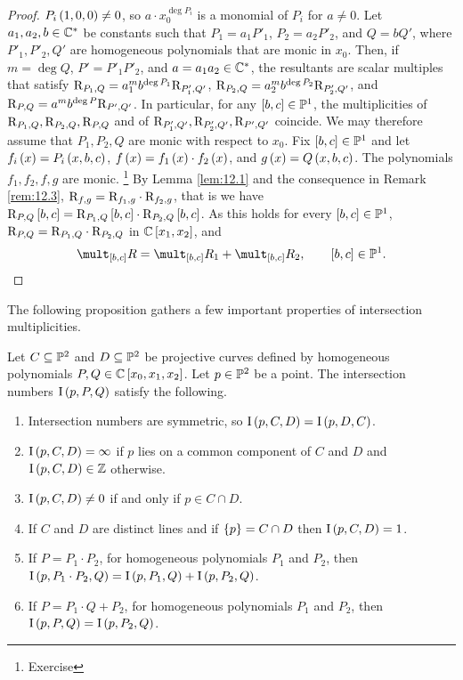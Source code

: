 \begin{proof}
$ P_i\br{1, 0, 0} \ne 0 $, so $ a \cdot x_0^{\deg P_i} $ is a monomial of $ P_i $ for $ a \ne 0 $. Let $ a_1, a_2, b \in \mathbb{C}^* $ be constants such that $ P_1 = a_1P'_1 $, $ P_2 = a_2P'_2 $, and $ Q = bQ' $, where $ P'_1, P'_2, Q' $ are homogeneous polynomials that are monic in $ x_0 $. Then, if $ m = \deg Q $, $ P' = P'_1P'_2 $, and $ a = a_1a_2 \in \mathbb{C}^* $, the resultants are scalar multiples that satisfy $ \mathrm{R}_{P_1, Q} = a_1^mb^{\deg P_1}\mathrm{R}_{P'_1, Q'} $, $ \mathrm{R}_{P_2, Q} = a_2^mb^{\deg P_2}\mathrm{R}_{P'_2, Q'} $, and $ \mathrm{R}_{P, Q} = a^mb^{\deg P}\mathrm{R}_{P', Q'} $. In particular, for any $ \sbr{b, c} \in \PP^1 $, the multiplicities of $ \mathrm{R}_{P_1, Q}, \mathrm{R}_{P_2, Q}, \mathrm{R}_{P, Q} $ and of $ \mathrm{R}_{P'_1, Q'}, \mathrm{R}_{P'_2, Q'}, \mathrm{R}_{P', Q'} $ coincide. We may therefore assume that $ P_1, P_2, Q $ are monic with respect to $ x_0 $. Fix $ \sbr{b, c} \in \PP^1 $ and let $ f_i\br{x} = P_i\br{x, b, c} $, $ f\br{x} = f_1\br{x} \cdot f_2\br{x} $, and $ g\br{x} = Q\br{x, b, c} $. The polynomials $ f_1, f_2, f, g $ are monic. \footnote{Exercise} By Lemma \ref{lem:12.1} and the consequence in Remark \ref{rem:12.3}, $ \mathrm{R}_{f, g} = \mathrm{R}_{f_1, g} \cdot \mathrm{R}_{f_2, g} $, that is we have $ \R_{P, Q}\sbr{b, c} = \R_{P_1, Q}\sbr{b, c} \cdot \R_{P_2, Q}\sbr{b, c} $. As this holds for every $ \sbr{b, c} \in \PP^1 $, $ \mathrm{R}_{P, Q} = \mathrm{R}_{P_1, Q} \cdot \mathrm{R}_{P_2, Q} $ in $ \CC\sbr{x_1, x_2} $, and
$$ \mult_{\sbr{b, c}} R = \mult_{\sbr{b, c}} R_1 + \mult_{\sbr{b, c}} R_2, \qquad \sbr{b, c} \in \PP^1. $$
\end{proof}

\pagebreak

The following proposition gathers a few important properties of intersection multiplicities.

\begin{proposition}
\label{prop:12.5}
Let $ C \subseteq \mathbb{P}^2 $ and $ D \subseteq \mathbb{P}^2 $ be projective curves defined by homogeneous polynomials $ P, Q \in \CC\sbr{x_0, x_1, x_2} $. Let $ p \in \mathbb{P}^2 $ be a point. The intersection numbers $ \I\br{p, P, Q} $ satisfy the following.
\begin{enumerate}
\item Intersection numbers are symmetric, so $ \I\br{p, C, D} = \I\br{p, D, C} $.
\item $ \I\br{p, C, D} = \infty $ if $ p $ lies on a common component of $ C $ and $ D $ and $ \I\br{p, C, D} \in \ZZ $ otherwise.
\item $ \I\br{p, C, D} \ne 0 $ if and only if $ p \in C \cap D $.
\item If $ C $ and $ D $ are distinct lines and if $ \cbr{p} = C \cap D $ then $ \I\br{p, C, D} = 1 $.
\item If $ P = P_1 \cdot P_2 $, for homogeneous polynomials $ P_1 $ and $ P_2 $, then $ \I\br{p, P_1 \cdot P_2, Q} = \I\br{p, P_1, Q} + \I\br{p, P_2, Q} $.
\item If $ P = P_1 \cdot Q + P_2 $, for homogeneous polynomials $ P_1 $ and $ P_2 $, then $ \I\br{p, P, Q} = \I\br{p, P_2, Q} $.
\end{enumerate}
\end{proposition}

